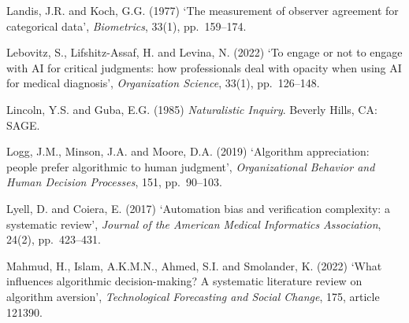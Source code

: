 \documentclass[11pt,a4paper]{article}
\numberwithin{figure}{section}
\numberwithin{table}{section}
\begin{document}
{\noindent\hypertarget{ref37}{}\begin{minipage}[t]{\dimexpr\linewidth-1.05cm\relax}Landis, J.R. and Koch, G.G. (1977) `The measurement of observer agreement for categorical data', \emph{Biometrics}, 33(1), pp.~159--174.\end{minipage}\par\vspace{4pt}
\noindent\hypertarget{ref38}{}\begin{minipage}[t]{\dimexpr\linewidth-1.05cm\relax}Lebovitz, S., Lifshitz-Assaf, H. and Levina, N. (2022) `To engage or not to engage with AI for critical judgments: how professionals deal with opacity when using AI for medical diagnosis', \emph{Organization Science}, 33(1), pp.~126--148.\end{minipage}\par\vspace{4pt}
\noindent\hypertarget{ref39}{}\begin{minipage}[t]{\dimexpr\linewidth-1.05cm\relax}Lincoln, Y.S. and Guba, E.G. (1985) \emph{Naturalistic Inquiry}. Beverly Hills, CA: SAGE.\end{minipage}\par\vspace{4pt}
\noindent\hypertarget{ref40}{}\begin{minipage}[t]{\dimexpr\linewidth-1.05cm\relax}Logg, J.M., Minson, J.A. and Moore, D.A. (2019) `Algorithm appreciation: people prefer algorithmic to human judgment', \emph{Organizational Behavior and Human Decision Processes}, 151, pp.~90--103.\end{minipage}\par\vspace{4pt}
\noindent\hypertarget{ref41}{}\begin{minipage}[t]{\dimexpr\linewidth-1.05cm\relax}Lyell, D. and Coiera, E. (2017) `Automation bias and verification complexity: a systematic review', \emph{Journal of the American Medical Informatics Association}, 24(2), pp.~423--431.\end{minipage}\par\vspace{4pt}
\noindent\hypertarget{ref42}{}\begin{minipage}[t]{\dimexpr\linewidth-1.05cm\relax}Mahmud, H., Islam, A.K.M.N., Ahmed, S.I. and Smolander, K. (2022) `What influences algorithmic decision-making? A systematic literature review on algorithm aversion', \emph{Technological Forecasting and Social Change}, 175, article 121390.\end{minipage}\par\vspace{4pt}
}
\end{document}
